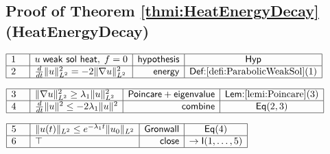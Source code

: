 \documentclass[11pt,reqno]{amsart}
\begin{document}
	\subsection*{Proof of Theorem \protect\ref{thmi:HeatEnergyDecay} (\textsf{HeatEnergyDecay})}
	\noindent$\begin{array}{|m{0.5cm}|l|r|c|}
	\hline
	1 & u\;\mathsf{weak\ sol\ heat},\;f=0 & \mathsf{hypothesis} & \mathsf{Hyp} \\ \hline
	2 & \tfrac{d}{dt}\|u\|_{L^{2}}^{2}=-2\|\nabla u\|_{L^{2}}^{2} & \mathsf{energy} & \textsf{Def:}\ref{defi:ParabolicWeakSol}(1) \\ \hline
	\end{array}$
	\par\nointerlineskip\noindent$\begin{array}{|m{0.5cm}|l|r|c|}
	\hline
	3 & \|\nabla u\|_{L^{2}}^{2}\ge\lambda_{1}\|u\|_{L^{2}}^{2} & \mathsf{Poincare+eigenvalue} & \textsf{Lem:}\ref{lemi:Poincare}(3) \\ \hline
	4 & \tfrac{d}{dt}\|u\|^{2}\le-2\lambda_{1}\|u\|^{2} & \mathsf{combine} & \mathsf{Eq}(2,3) \\ \hline
	\end{array}$
	\par\nointerlineskip\noindent$\begin{array}{|m{0.5cm}|l|r|c|}
	\hline
	5 & \|u(t)\|_{L^{2}}\le e^{-\lambda_{1}t}\|u_{0}\|_{L^{2}} & \mathsf{Gronwall} & \mathsf{Eq}(4) \\ \hline
	6 & \top & \mathsf{close} & \to\mathsf{I}(1,\dots,5) \\ \hline
	\end{array}$
	\medskip
	
\end{document}
